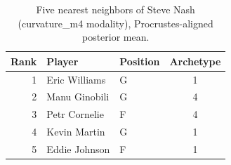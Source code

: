 \begin{table}[htbp]
  \centering\small
  \begin{tabular}{rllc}
    \toprule
    Rank & Player & Position & Archetype \\
    \midrule
    1 & Eric Williams & G & 1 \\
    2 & Manu Ginobili & G & 4 \\
    3 & Petr Cornelie & F & 4 \\
    4 & Kevin Martin & G & 1 \\
    5 & Eddie Johnson & F & 1 \\
    \bottomrule
  \end{tabular}
  \caption{Five nearest neighbors of Steve Nash (curvature_m4 modality), Procrustes-aligned posterior mean.}
  \label{tab:Steve_Nash_neighbors_curvature_m4}
\end{table}

